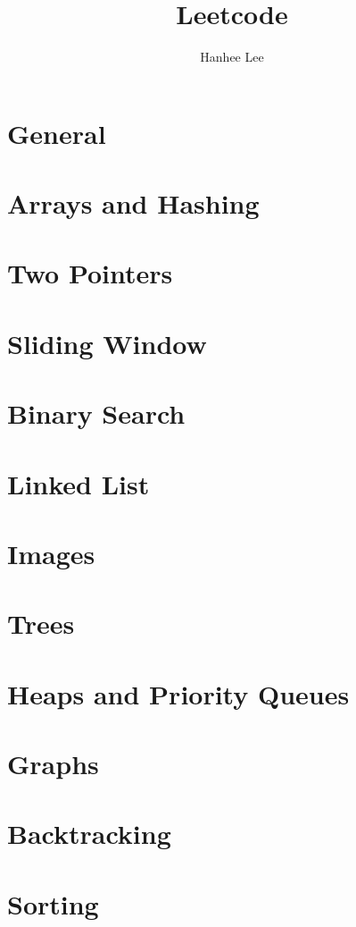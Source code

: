 \documentclass{article}
\title{Leetcode}
\author{Hanhee Lee}
\begin{document}
\maketitle

\tableofcontents
\newpage

\section{General}

\newpage

\section{Arrays and Hashing}

\newpage

\section{Two Pointers}

\newpage

\section{Sliding Window}

\newpage

\section{Binary Search}

\newpage

\section{Linked List}

\newpage

\section{Images}

\newpage

\section{Trees}

\newpage

\section{Heaps and Priority Queues}

\newpage

\section{Graphs}

\newpage

\section{Backtracking}

\newpage

\section{Sorting}

\newpage
\end{document}
